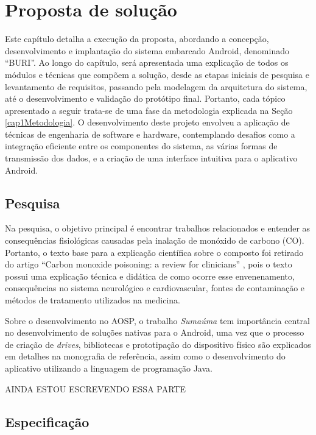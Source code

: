 \chapter{Proposta de solução}

Este capítulo detalha a execução da proposta, abordando a concepção, desenvolvimento e 
implantação do sistema embarcado Android, denominado ``BURI''. Ao longo do capítulo, será apresentada uma explicação de todos os 
módulos e técnicas que compõem a solução, desde as etapas iniciais de pesquisa e levantamento de requisitos, passando pela modelagem da arquitetura do sistema, 
até o desenvolvimento e validação do protótipo final. Portanto, cada tópico apresentado a seguir trata-se de uma fase da metodologia 
explicada na Seção \ref{cap1Metodologia}. O desenvolvimento deste projeto envolveu a aplicação de técnicas de engenharia de software e hardware, contemplando desafios 
como a integração eficiente entre os componentes do sistema, as várias formas de transmissão dos dados, e a criação de uma interface intuitiva para o aplicativo Android.

\section{Pesquisa}

Na pesquisa, o objetivo principal é encontrar trabalhos relacionados e entender as consequências fisiológicas causadas pela 
inalação de monóxido de carbono (CO). Portanto, o texto base para a explicação científica sobre o composto foi retirado 
do artigo ``Carbon monoxide poisoning: a review for clinicians'' \cite{carbon-monoxide-poisoning-varon}, pois o texto possui 
uma explicação técnica e didática de como ocorre esse envenenamento, consequências no sistema neurológico e cardiovascular, fontes de 
contaminação e métodos de tratamento utilizados na medicina.

Sobre o desenvolvimento no AOSP, o trabalho \textit{Sumaúma} \cite{ufam-aosp-sumama} tem importância central no desenvolvimento de 
soluções nativas para o Android, uma vez que o processo de criação de \textit{drives}, bibliotecas e prototipação do dispositivo físico são 
explicados em detalhes na monografia de referência, assim como o desenvolvimento do aplicativo utilizando a linguagem de programação Java.

AINDA ESTOU ESCREVENDO ESSA PARTE

\section{Especificação}

